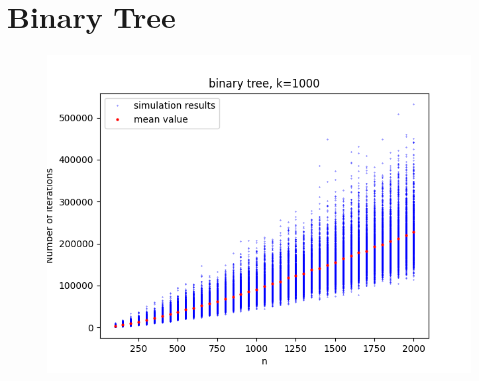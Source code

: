 \documentclass{article}
\begin{document}
\section{Binary Tree}
\begin{figure}[htp]
  \centering
    \includegraphics[width=0.5\linewidth]{binary_tree.png}
    \label{fig:binary_tree}
\end{figure}
\end{document}
